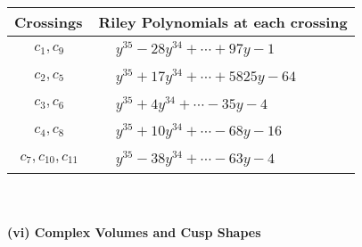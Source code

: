 \documentclass[1p]{elsarticle_modified}
\theoremstyle{definition}
\begin{document}
\begin{tabular}{m{50pt}|m{274pt}}
Crossings & \hspace{64pt}Riley Polynomials at each crossing \\
\hline $$\begin{aligned}c_{1},c_{9}\end{aligned}$$&$\begin{aligned}
&y^{35}-28 y^{34}+\cdots+97 y-1
\end{aligned}$\\
\hline $$\begin{aligned}c_{2},c_{5}\end{aligned}$$&$\begin{aligned}
&y^{35}+17 y^{34}+\cdots+5825 y-64
\end{aligned}$\\
\hline $$\begin{aligned}c_{3},c_{6}\end{aligned}$$&$\begin{aligned}
&y^{35}+4 y^{34}+\cdots-35 y-4
\end{aligned}$\\
\hline $$\begin{aligned}c_{4},c_{8}\end{aligned}$$&$\begin{aligned}
&y^{35}+10 y^{34}+\cdots-68 y-16
\end{aligned}$\\
\hline $$\begin{aligned}c_{7},c_{10},c_{11}\end{aligned}$$&$\begin{aligned}
&y^{35}-38 y^{34}+\cdots-63 y-4
\end{aligned}$\\
\hline
\end{tabular}\\~\\
\newpage\flushleft \textbf{(vi) Complex Volumes and Cusp Shapes}
\end{document}
